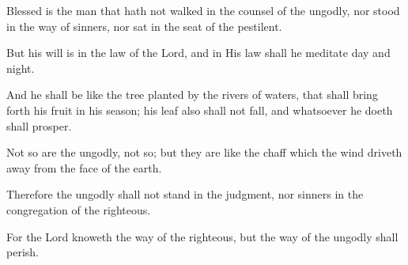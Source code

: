 Blessed is the man that hath not walked in the counsel of the ungodly, nor stood in the way of sinners, nor sat in the seat of the pestilent.

But his will is in the law of the Lord, and in His law shall he meditate day and night.

And he shall be like the tree planted by the rivers of waters, that shall bring forth his fruit in his season; his leaf also shall not fall, and whatsoever he doeth shall prosper.

Not so are the ungodly, not so; but they are like the chaff which the wind driveth away from the face of the earth.

Therefore the ungodly shall not stand in the judgment, nor sinners in the congregation of the righteous.

For the Lord knoweth the way of the righteous, but the way of the ungodly shall perish.
